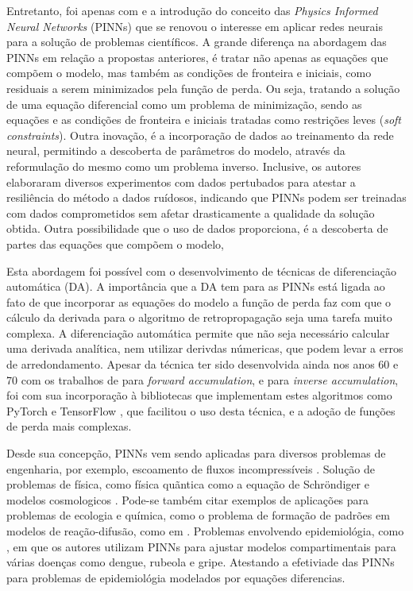 Entretanto, foi apenas com \cite{raissi-etal:19} e a introdução do conceito das 
\textit{Physics Informed Neural Networks} (PINNs) que se renovou o interesse 
em aplicar redes neurais para a solução de problemas científicos.
A grande diferença na abordagem das PINNs em relação a propostas anteriores, 
é tratar não apenas as equações que compõem o modelo, mas também as condições
de fronteira e iniciais, como residuais a serem minimizados pela função de perda.
Ou seja, tratando a solução de uma equação diferencial como um problema de
minimização, sendo as equações e as condições de fronteira e iniciais tratadas 
como restrições leves (\textit{soft constraints}). 
Outra inovação, é a incorporação de dados ao treinamento da rede neural, 
permitindo a descoberta de parâmetros do modelo, através da reformulação do 
mesmo como um problema inverso.
Inclusive, os autores elaboraram diversos experimentos com dados pertubados
para atestar a resiliência do método a dados ruídosos, indicando que PINNs
podem ser treinadas com dados comprometidos sem afetar drasticamente a qualidade
da solução obtida.
Outra possibilidade que o uso de dados proporciona,
é a descoberta de partes das equações que compõem o modelo,  

Esta abordagem foi possível com o desenvolvimento de técnicas de 
diferenciação automática (DA).
A importância que a DA tem para as PINNs está ligada ao fato de que incorporar
as equações do modelo a função de perda faz com que o cálculo da derivada 
para o algoritmo de retropropagação seja uma tarefa muito complexa. A diferenciação
automática permite que não seja necessário calcular uma derivada analítica, nem
utilizar derivdas númericas, que podem levar a erros de arredondamento.
Apesar da técnica ter sido desenvolvida ainda nos anos 60 e 70 com 
os trabalhos de \cite{wengert:64-diferenciao-automatica} 
para \textit{forward accumulation}, e \cite{linnainmaa:76-diferenciao-automatica} 
para \textit{inverse accumulation}, foi com sua incorporação à bibliotecas 
que implementam estes algoritmos como PyTorch \cite{pytorch:19} e 
TensorFlow \cite{tensorflow:16}, que facilitou o uso desta técnica,
e a adoção de funções de perda mais complexas. 

Desde sua concepção, PINNs vem sendo aplicadas para diversos problemas 
de engenharia, por exemplo, escoamento de fluxos incompressíveis 
\cite{jin-et-al:21-navier-stokes}. Solução de problemas de física, como
física quãntica como a equação de Schröndiger \cite{jin-etal:2022-schrondiger}
e modelos cosmologicos \cite{chantada-etal:2023-cosmologia}.
Pode-se também citar exemplos de aplicações para problemas de ecologia e química, 
como o problema de formação de padrões em modelos de reação-difusão, como em 
\cite{giampaolo-etal:22-gray-scott}.
Problemas envolvendo epidemiológia, como \cite{shaier-etal:22-dinns}, em que
os autores utilizam PINNs para ajustar modelos compartimentais para várias 
doenças como dengue, rubeola e gripe. Atestando a efetiviade das PINNs para 
problemas de epidemiológia modelados por equações diferencias.

